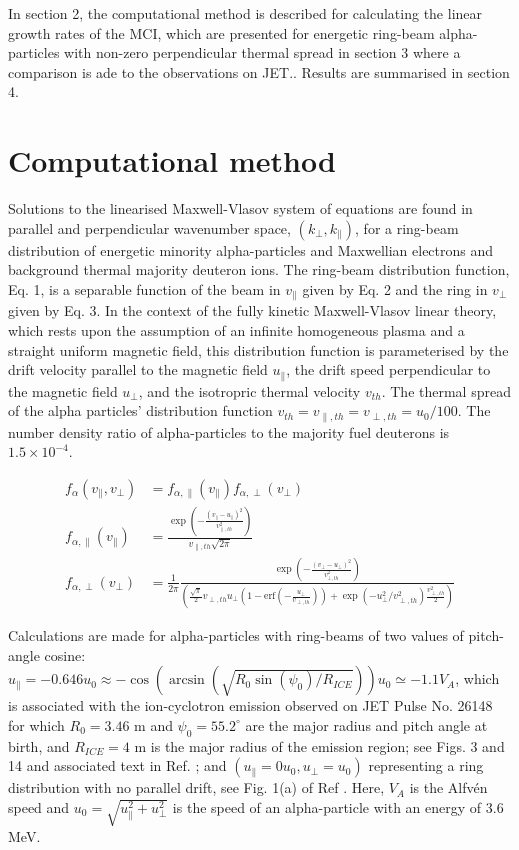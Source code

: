 \documentclass[12pt]{iopart}
\begin{document}
In section 2, the computational method is described for calculating
the linear growth rates of the MCI, which are presented for energetic ring-beam
alpha-particles with non-zero perpendicular thermal spread in section 3
where a comparison is ade to the observations on JET..
Results are summarised in section 4.

\section{Computational method}

Solutions to the linearised Maxwell-Vlasov system of equations are found in
parallel and perpendicular wavenumber space, $(k_\bot, k_\parallel)$, for a
ring-beam distribution of energetic minority
alpha-particles and Maxwellian electrons and background thermal majority
deuteron ions. The ring-beam distribution function, Eq. 1, is a separable
function of the beam in $v_\parallel$ given by Eq. 2 and the
ring in $v_\perp$ given by Eq. 3.
In the context of the fully kinetic Maxwell-Vlasov linear theory,
which rests upon the assumption of
an infinite homogeneous plasma and a straight uniform magnetic field,
this distribution function is parameterised  by the drift
velocity parallel to the magnetic field $u_\parallel$, the drift speed 
perpendicular to the magnetic
field $u_{\perp}$, and the isotropric thermal velocity $v_{th}$. The
thermal spread of the alpha particles' distribution function 
$v_{th}=v_{\parallel,th}=v_{\perp,th}=u_0/100$. The number density
ratio of alpha-particles to the majority fuel deuterons is $1.5\times10^{-4}$.

\begin{align}
f_\alpha\left(v_\parallel, v_\perp\right) &=
  f_{\alpha,\parallel}\left(v_\parallel\right)f_{\alpha,\perp}\left(v_\perp\right)\\
f_{\alpha,\parallel}\left(v_\parallel\right) &=
  \frac{\exp\left(-\frac{(v_\parallel -
  u_\parallel)^2}{v_{\parallel,th}^2}\right)}{v_{\parallel,th} \sqrt{2
  \pi}}\\
f_{\alpha,\perp}\left(v_\perp\right) &=
  \frac{1}{2\pi}\frac{\exp\left(-\frac{\left(v_\bot -
  u_\bot\right)^2}{v_{\bot,th}^2}\right)}{\left(\frac{\sqrt \pi}{2} v_{\perp,
  th} u_\bot (1 - \mathrm{erf}(-\frac{u_\bot}{v_{\perp,th}})) + \exp(-u_\bot^2 /
  v_{\perp, th}^2) \frac{v_{\perp,th}^2}{2}\right)}
\end{align}

Calculations are made for alpha-particles with ring-beams of two
values of pitch-angle cosine: $u_\parallel=-0.646 u_0 \approx
-\cos(\arcsin(\sqrt{R_0 \sin(\psi_0)/R_{ICE}})) u_0 \simeq -1.1 V_A$, which is
associated with the ion-cyclotron emission observed on JET Pulse No. 26148 for
which $R_0=3.46$ m and
$\psi_0=55.2^\circ$ are the major radius and pitch angle at birth, and
$R_{ICE}=4$ m is the major radius of the emission region; see
Figs. 3 and 14 and associated text in Ref. \cite{Cottrell1993}; and
$(u_\parallel=0 u_0, u_\bot=u_0)$ representing a ring distribution with
no parallel drift, see
Fig. 1(a) of Ref \cite{Cook2013}. Here, $V_A$ is the Alfv{\'en} speed and $u_0=\sqrt{u_\parallel^2 + u_\perp^2}$ is
the speed of an alpha-particle with an energy of 3.6 MeV.
\end{document}
